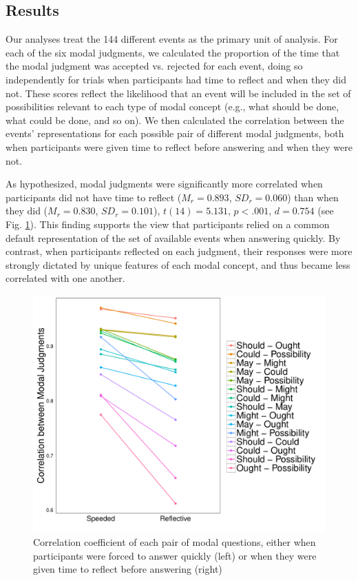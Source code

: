 \documentclass[9pt,twocolumn,twoside]{pnas-new}
\begin{document}
\subsection*{Results} Our analyses treat the 144 different events as the primary unit of analysis. For each of the six modal judgments, we calculated the proportion of the time that the modal judgment was accepted vs. rejected for each event, doing so independently for trials when participants had time to reflect and when they did not. These scores reflect the likelihood that an event will be included in the set of possibilities relevant to each type of modal concept (e.g., what should be done, what could be done, and so on). We then calculated the correlation between the events' representations for each possible pair of different modal judgments, both when participants were given time to reflect before answering and when they were not.

  As hypothesized, modal judgments were significantly more correlated when participants did not have time to reflect ($M_{r} = 0.893$, $SD_{r} = 0.060$) than when they did ($M_{r} = 0.830$, $SD_{r} = 0.101$), $t(14) = 5.131$, $p  < .001$, $d = 0.754$ (see Fig. \ref{fig:fig2}). This finding supports the view that participants relied on a common default representation of the set of available events when answering quickly. By contrast, when participants reflected on each judgment, their responses were more strongly dictated by unique features of each modal concept, and thus became less correlated with one another.

\begin{figure}%
\centering
\includegraphics[width=.9\linewidth]{fig2}
\caption{Correlation coefficient of each pair of modal questions, either when participants were forced to answer quickly (left) or when they were given time to reflect before answering (right)}
\label{fig:fig2}
\end{figure}
\end{document}
